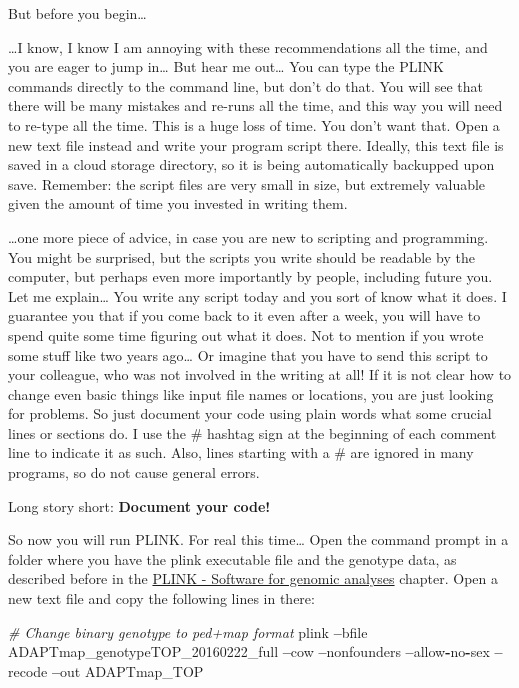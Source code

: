 \documentclass[]{book}
\newenvironment{Shaded}{\begin{snugshade}}{\end{snugshade}}
\newcommand{\CommentTok}[1]{\textcolor[rgb]{0.56,0.35,0.01}{\textit{#1}}}
\newcommand{\OperatorTok}[1]{\textcolor[rgb]{0.81,0.36,0.00}{\textbf{#1}}}
\newcommand{\NormalTok}[1]{#1}
\begin{document}
But before you begin\ldots{}

\ldots{}I know, I know I am annoying with these recommendations all the
time, and you are eager to jump in\ldots{} But hear me out\ldots{} You
can type the PLINK commands directly to the command line, but don't do
that. You will see that there will be many mistakes and re-runs all the
time, and this way you will need to re-type all the time. This is a huge
loss of time. You don't want that. Open a new text file instead and
write your program script there. Ideally, this text file is saved in a
cloud storage directory, so it is being automatically backupped upon
save. Remember: the script files are very small in size, but extremely
valuable given the amount of time you invested in writing them.

\ldots{}one more piece of advice, in case you are new to scripting and
programming. You might be surprised, but the scripts you write should be
readable by the computer, but perhaps even more importantly by people,
including future you. Let me explain\ldots{} You write any script today
and you sort of know what it does. I guarantee you that if you come back
to it even after a week, you will have to spend quite some time figuring
out what it does. Not to mention if you wrote some stuff like two years
ago\ldots{} Or imagine that you have to send this script to your
colleague, who was not involved in the writing at all! If it is not
clear how to change even basic things like input file names or
locations, you are just looking for problems. So just document your code
using plain words what some crucial lines or sections do. I use the \#
hashtag sign at the beginning of each comment line to indicate it as
such. Also, lines starting with a \# are ignored in many programs, so do
not cause general errors.

Long story short: \textbf{Document your code!}

So now you will run PLINK. For real this time\ldots{} Open the command
prompt in a folder where you have the plink executable file and the
genotype data, as described before in the
\protect\hyperlink{plink---software-for-genomic-analyses}{PLINK -
Software for genomic analyses} chapter. Open a new text file and copy
the following lines in there:

\begin{Shaded}
\begin{Highlighting}[]
\CommentTok{# Change binary genotype to ped+map format}
\NormalTok{plink }\OperatorTok{--}\NormalTok{bfile ADAPTmap_genotypeTOP_20160222_full }\OperatorTok{--}\NormalTok{cow }\OperatorTok{--}\NormalTok{nonfounders }\OperatorTok{--}\NormalTok{allow}\OperatorTok{-}\NormalTok{no}\OperatorTok{-}\NormalTok{sex }\OperatorTok{--}\NormalTok{recode }\OperatorTok{--}\NormalTok{out ADAPTmap_TOP}
\end{Highlighting}
\end{Shaded}
\end{document}
